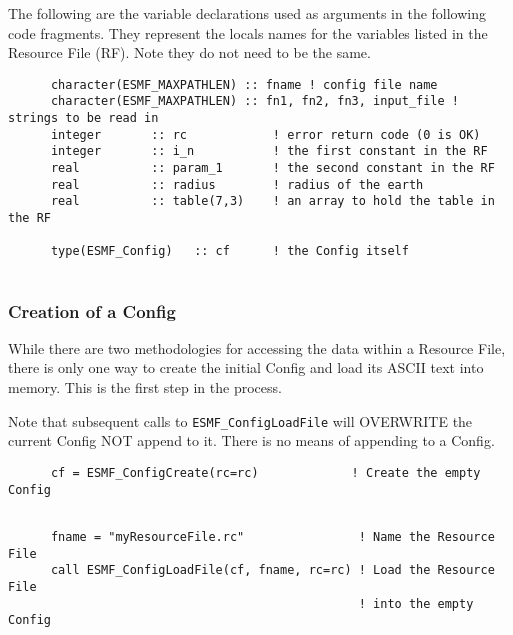    The following are the variable declarations used as arguments in the following code 
   fragments. They represent the locals names for the variables listed in the Resource 
   File (RF).  Note they do not need to be the same. 

 \begin{verbatim}
      character(ESMF_MAXPATHLEN) :: fname ! config file name
      character(ESMF_MAXPATHLEN) :: fn1, fn2, fn3, input_file ! strings to be read in
      integer       :: rc            ! error return code (0 is OK)
      integer       :: i_n           ! the first constant in the RF
      real          :: param_1       ! the second constant in the RF
      real          :: radius        ! radius of the earth
      real          :: table(7,3)    ! an array to hold the table in the RF

      type(ESMF_Config)   :: cf      ! the Config itself
 
\end{verbatim}
 

  \subsubsection{Creation of a Config}
 
   While there are two methodologies for accessing the data within a Resource File, 
   there is only one way to create the initial Config and load its ASCII text into 
   memory. This is the first step in the process.
 
   Note that subsequent calls to {\tt ESMF\_ConfigLoadFile} will OVERWRITE the current
   Config NOT append to it. There is no means of appending to a Config. 
   

 \begin{verbatim}
      cf = ESMF_ConfigCreate(rc=rc)             ! Create the empty Config
 
\end{verbatim}
 

 \begin{verbatim}
      fname = "myResourceFile.rc"                ! Name the Resource File
      call ESMF_ConfigLoadFile(cf, fname, rc=rc) ! Load the Resource File 
                                                 ! into the empty Config
 
\end{verbatim}
 
